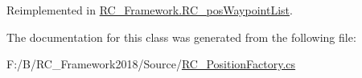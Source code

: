 Reimplemented in \mbox{\hyperlink{class_r_c___framework_1_1_r_c__pos_waypoint_list_acb5b5300a57cd6fc7c24db08bb27cdbf}{R\+C\+\_\+\+Framework.\+R\+C\+\_\+pos\+Waypoint\+List}}.



The documentation for this class was generated from the following file\+:\begin{DoxyCompactItemize}
\item 
F\+:/\+B/\+R\+C\+\_\+\+Framework2018/\+Source/\mbox{\hyperlink{_r_c___position_factory_8cs}{R\+C\+\_\+\+Position\+Factory.\+cs}}\end{DoxyCompactItemize}

